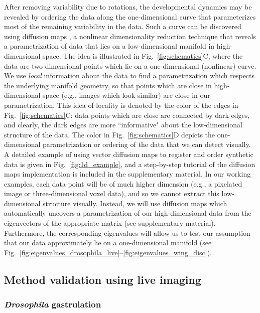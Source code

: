 \documentclass[twocolumn, 10pt]{article}
\newcommand{\SI}[0]{supplementary material}
\newcommand{\fig}[0]{Fig.}
\begin{document}
After removing variability due to rotations, the developmental dynamics may be revealed by ordering the data along the one-dimensional curve that parameterizes most of the remaining variability in the data.
%
Such a curve can be discovered using diffusion maps \citep{coifman2005geometric}, a nonlinear dimensionality reduction technique that reveals a parametrization of data that lies on a low-dimensional manifold in high-dimensional space.
%
The idea is illustrated in \fig~\ref{fig:schematics}C, where the data are two-dimensional points which lie on a one-dimensional (nonlinear) curve.
%
We use {\it local} information about the data to find a parametrization which respects the underlying manifold geometry, so that points which are close in high-dimensional space (e.g., images which look similar) are close in our parametrization.
%
This idea of locality is denoted by the color of the edges in \fig~\ref{fig:schematics}C:
data points which are close are connected by dark edges, and clearly, the dark edges are more ``informative" about the low-dimensional structure of the data.
%
The color in \fig~\ref{fig:schematics}D depicts the one-dimensional parametrization or ordering of the data that we can detect visually.
%
A detailed example of using vector diffusion maps to register and order synthetic data is given in \fig~\ref{fig:1d_example}, and a step-by-step tutorial of the diffusion maps implementation is included in the \SI.
%
In our working examples, each data point will be of much higher dimension (e.g., a pixelated image or three-dimensional voxel data), and so we cannot extract this low-dimensional structure visually.
%
Instead, we will use diffusion maps which automatically uncovers a parametrization of our high-dimensional data from the eigenvectors of the appropriate matrix (see \SI).
%
Furthermore, the corresponding eigenvalues will allow us to test our assumption that our data approximately lie on a one-dimensional manifold (see \fig~\ref{fig:eigenvalues_drosophila_live}--\ref{fig:eigenvalues_wing_disc}).
%


\subsection*{Method validation using live imaging}

\subsubsection*{{\em Drosophila} gastrulation}
\end{document}
